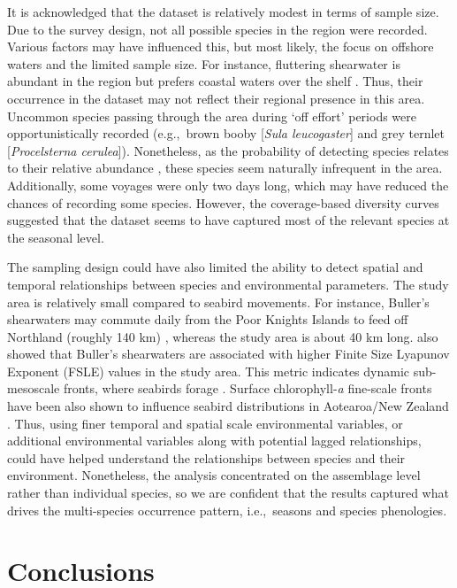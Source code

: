 \documentclass[preprint, 3p, authoryear]{elsarticle} %
\begin{document}
It is acknowledged that the dataset is relatively modest in terms of sample size. Due to the survey design, not all possible species in the region were recorded. Various factors may have influenced this, but most likely, the focus on offshore waters and the limited sample size. For instance, fluttering shearwater is abundant in the region but prefers coastal waters over the shelf \citep{berg2019}. Thus, their occurrence in the dataset may not reflect their regional presence in this area. Uncommon species passing through the area during `off effort' periods were opportunistically recorded (e.g.,~brown booby [\emph{Sula leucogaster}] and grey ternlet [\emph{Procelsterna cerulea}]). Nonetheless, as the probability of detecting species relates to their relative abundance \citep{mccarthy2013}, these species seem naturally infrequent in the area. Additionally, some voyages were only two days long, which may have reduced the chances of recording some species. However, the coverage-based diversity curves suggested that the dataset seems to have captured most of the relevant species at the seasonal level.

The sampling design could have also limited the ability to detect spatial and temporal relationships between species and environmental parameters. The study area is relatively small compared to seabird movements. For instance, Buller's shearwaters may commute daily from the Poor Knights Islands to feed off Northland (roughly 140 km) \citep{whitehead2023}, whereas the study area is about 40 km long. \citet{whitehead2023} also showed that Buller's shearwaters are associated with higher Finite Size Lyapunov Exponent (FSLE) values in the study area. This metric indicates dynamic sub-mesoscale fronts, where seabirds forage \citep{tewkai2009, scales2014mesoscale}. Surface chlorophyll-\emph{a} fine-scale fronts have been also shown to influence seabird distributions in Aotearoa/New Zealand \citep{lheriau2025}. Thus, using finer temporal and spatial scale environmental variables, or additional environmental variables along with potential lagged relationships, could have helped understand the relationships between species and their environment. Nonetheless, the analysis concentrated on the assemblage level rather than individual species, so we are confident that the results captured what drives the multi-species occurrence pattern, i.e.,~seasons and species phenologies.

\section{Conclusions}
\end{document}
